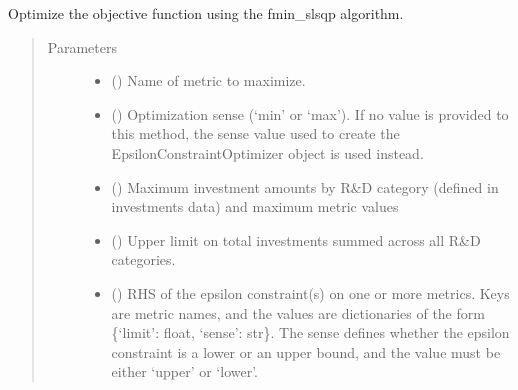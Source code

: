 \documentclass[letterpaper,10pt,english]{sphinxmanual}
\begin{document}
\begin{fulllineitems}
\begin{fulllineitems}
\begin{quote}
\begin{description}
\end{description}\end{quote}

\end{fulllineitems}


\begin{fulllineitems}
\label{\detokenize{doc-src/tyche:tyche.EpsilonConstraints.EpsilonConstraintOptimizer.opt_slsqp}}
Optimize the objective function using the fmin\_slsqp algorithm.
\begin{quote}\begin{description}
\item[{Parameters}] \leavevmode\begin{itemize}
\item {} 
 () \textendash{} Name of metric to maximize.

\item {} 
 () \textendash{} Optimization sense (‘min’ or ‘max’). If no value is provided to
this method, the sense value used to create the
EpsilonConstraintOptimizer object is used instead.

\item {} 
 () \textendash{} Maximum investment amounts by R\&D category (defined in investments data)
and maximum metric values

\item {} 
 () \textendash{} Upper limit on total investments summed across all R\&D categories.

\item {} 
 () \textendash{} RHS of the epsilon constraint(s) on one or more metrics. Keys are metric
names, and the values are dictionaries of the form
\{‘limit’: float, ‘sense’: str\}. The sense defines whether the epsilon
constraint is a lower or an upper bound, and the value must be either
‘upper’ or ‘lower’.


\end{itemize}
\end{description}
\end{quote}
\end{fulllineitems}
\end{fulllineitems}
\end{document}
